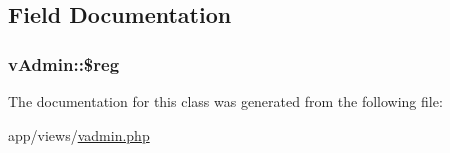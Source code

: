 \subsection{Field Documentation}
\hypertarget{classvAdmin_ae8b421488305f3ea9c65efc737db763d}{}
\subsubsection[{\$reg}]{\setlength{\rightskip}{0pt plus 5cm}v\+Admin\+::\$reg\hspace{0.3cm}{\ttfamily [protected]}}\label{classvAdmin_ae8b421488305f3ea9c65efc737db763d}


The documentation for this class was generated from the following file\+:\begin{DoxyCompactItemize}
\item 
app/views/\hyperlink{vadmin_8php}{vadmin.\+php}\end{DoxyCompactItemize}
